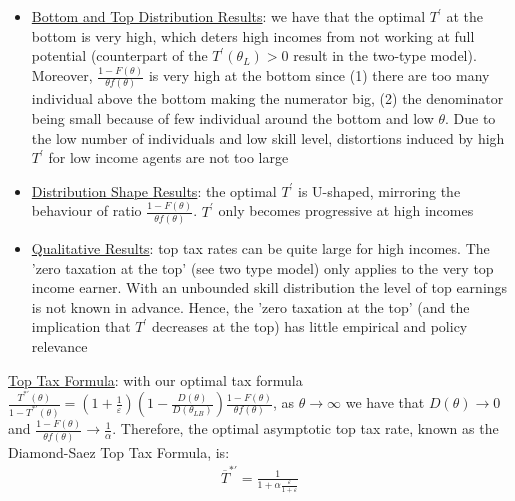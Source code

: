 \documentclass{article}
\begin{document}
\begin{itemize}
 \item  \underline{Bottom and Top Distribution Results}: we have that the optimal $T^{'}$ at the bottom is very high, which deters high incomes from not working at full potential (counterpart of the $T^{'}(\theta_{L}) > 0$ result in the two-type model). Moreover, $\frac{1 - F(\theta)}{\theta f(\theta)}$ is very high at the bottom since (1) there are too many individual above the bottom making the numerator big, (2) the denominator being small because of few individual around the bottom and low $\theta$. Due to the low number of individuals and low skill level, distortions induced by high $T^{'}$ for low income agents are not too large
 \item  \underline{Distribution Shape Results}: the optimal $T^{'}$ is U-shaped, mirroring the behaviour of ratio  $\frac{1 - F(\theta)}{\theta f(\theta)}$. $T^{'}$ only becomes progressive at high incomes
 \item  \underline{Qualitative Results}: top tax rates can be quite large for high incomes. The 'zero taxation at the top' (see two type model) only applies to the very top income earner. With an unbounded skill distribution the level of top earnings is not known in advance. Hence, the 'zero taxation at the top' (and the implication that $T^{'}$ decreases at the top) has little empirical and policy relevance
\end{itemize}
\vspace{2.5mm}
\par \underline{Top Tax Formula}: with our optimal tax formula $\frac{T^{*'}(\theta)}{1 - T^{*'}(\theta)} = (1 + \frac{1}{\varepsilon}) (1 - \frac{D(\theta)}{D(\theta_{LB})}) \frac{1 - F(\theta)}{\theta f(\theta)}$, as $\theta \rightarrow \infty$ we have that $D(\theta) \rightarrow 0$ and $\frac{1 - F(\theta)}{\theta f(\theta)} \rightarrow \frac{1}{\alpha}$. Therefore, the optimal asymptotic top tax rate, known as the Diamond-Saez Top Tax Formula, is:
\begin{gather*}
    \overline{T}^{*'} = \frac{1}{1 + \alpha \tfrac{\varepsilon}{1 + \varepsilon}}
\end{gather*}
\end{document}
